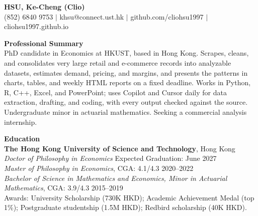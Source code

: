 \documentclass[11pt,letterpaper]{article}
\begin{document}
{\Large \textbf{HSU, Ke-Cheng (Clio)}}\\[2pt]
(852) 6840 9753 \quad $|$ \quad khsu@connect.ust.hk \quad $|$ \quad github.com/cliohsu1997 \quad $|$ \quad cliohsu1997.github.io

\vspace{1pt}

{\large \textbf{Professional Summary}}\\[1pt]
PhD candidate in Economics at HKUST, based in Hong Kong. Scrapes, cleans, and consolidates very large retail and e-commerce records into analyzable datasets, estimates demand, pricing, and margins, and presents the patterns in charts, tables, and weekly HTML reports on a fixed deadline. Works in Python, R, C++, Excel, and PowerPoint; uses Copilot and Cursor daily for data extraction, drafting, and coding, with every output checked against the source. Undergraduate minor in actuarial mathematics. Seeking a commercial analysis internship.

\vspace{1pt}

{\large \textbf{Education}}\\[1pt]
\textbf{The Hong Kong University of Science and Technology}, Hong Kong\\
\textit{Doctor of Philosophy in Economics} \hfill Expected Graduation: June 2027\\
\textit{Master of Philosophy in Economics}, CGA: 4.1/4.3 \hfill 2020--2022\\
\textit{Bachelor of Science in Mathematics and Economics, Minor in Actuarial Mathematics}, CGA: 3.9/4.3 \hfill 2015--2019\\
Awards: University Scholarship (730K HKD); Academic Achievement Medal (top 1\%); Postgraduate studentship (1.5M HKD); Redbird scholarship (40K HKD).

\vspace{1pt}
\end{document}
